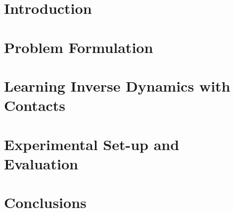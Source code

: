 \begin{abstract}
	
\end{abstract}


\section{Introduction}
\label{sec:introduction}

	 


\section{Problem Formulation}
\label{sec:problem}

	
    

\section{Learning Inverse Dynamics with Contacts}
\label{sec:mgp}

	 
	

\section{Experimental Set-up and Evaluation}
\label{sec:results}

	 


\section{Conclusions}
\label{sec:conclusion}

	 

